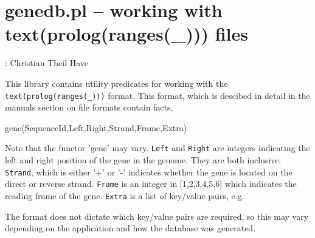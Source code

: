 


\section{genedb.pl -- working with text(prolog(ranges(_))) files}

\label{sec:genedb}

\begin{tags}
: Christian Theil Have
\end{tags}

This library contains utility predicates for working with the \verb$text(prolog(ranges(_)))$ format.
This format, which is descibed in detail in the manuals section on file formats contain
facts,

\begin{code}
gene(SequenceId,Left,Right,Strand,Frame,Extra)
\end{code}

Note that the functor 'gene' may vary.
\verb$Left$ and \verb$Right$ are integers indicating the left and right position of the gene in the genome.
They are both inclusive. \verb$Strand$, which is either '+' or '-' indicates whether the gene is located
on the direct or reverse strand. \verb$Frame$ is an integer in [1,2,3,4,5,6] which indicates the reading
frame of the gene. \verb$Extra$ is a list of key/value pairs, e.g.

\begin{code}
\end{code}

The format does not dictate which key/value pairs are required, so this may vary depending on the
application and how the database was generated.\vspace{0.7cm}

